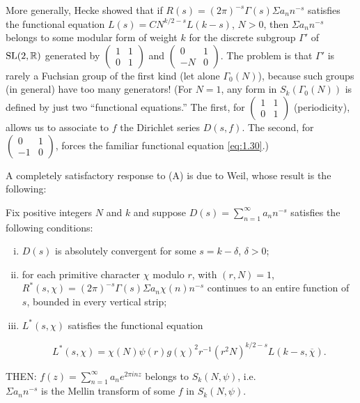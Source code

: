 More generally, Hecke showed that if $R(s) = (2\pi)^{-s}\Gamma(s)\Sigma a_n n^{-s}$ satisfies the functional equation $L(s) = CN^{k/2 - s}L(k - s)$, $N > 0$, then $\Sigma a_n n^{-s}$ belongs to some modular form of weight $k$ for the discrete subgroup $\Gamma'$ of $\operatorname{SL}(2,\mathbb{R})$ generated by $\begin{pmatrix} 1 & 1 \\ 0 & 1 \end{pmatrix}$ and $\begin{pmatrix} 0 & 1 \\ -N & 0 \end{pmatrix}$. The problem is that $\Gamma'$ is rarely a Fuchsian group of the first kind (let alone $\Gamma_0(N)$), because such groups (in general) have too many generators! (For $N = 1$, any form in $S_k(\Gamma_0(N))$ is defined by just two ``functional equations.'' The first, for $\begin{pmatrix} 1 & 1 \\ 0 & 1 \end{pmatrix}$ (periodicity), allows us to associate to $f$ the Dirichlet series $D(s,f)$. The second, for $\begin{pmatrix} 0 & 1 \\ -1 & 0 \end{pmatrix}$, forces the familiar functional equation \eqref{eq:1.30}.)

A completely satisfactory response to (A) is due to Weil, whose result is the following:

\begin{theorem}\label{thm:1.12}

Fix positive integers $N$ and $k$ and suppose $D(s) = \sum_{n=1}^{\infty} a_n n^{-s}$ satisfies the following conditions:

\begin{enumerate}[(i)]

\item $D(s)$ is absolutely convergent for some $s = k - \delta$, $\delta > 0$;

\item for each primitive character $\chi$ modulo $r$, with $(r,N) = 1$, $R^*(s,\chi) = (2\pi)^{-s}\Gamma(s)\Sigma a_n \chi(n) n^{-s}$ continues to an entire function of $s$, bounded in every vertical strip;

\item $L^*(s,\chi)$ satisfies the functional equation

\[
L^*(s,\chi) = \chi(N)\psi(r) g(\chi)^2 r^{-1} (r^2 N)^{k/2 - s} L(k - s, \overline{\chi}).
\]

\end{enumerate}

THEN: $f(z) = \sum_{n=1}^{\infty} a_n e^{2\pi inz}$ belongs to $S_k(N,\psi)$, i.e.\\

$\Sigma a_n n^{-s}$ is the Mellin transform of some $f$ in $S_k(N,\psi)$.

\end{theorem}

